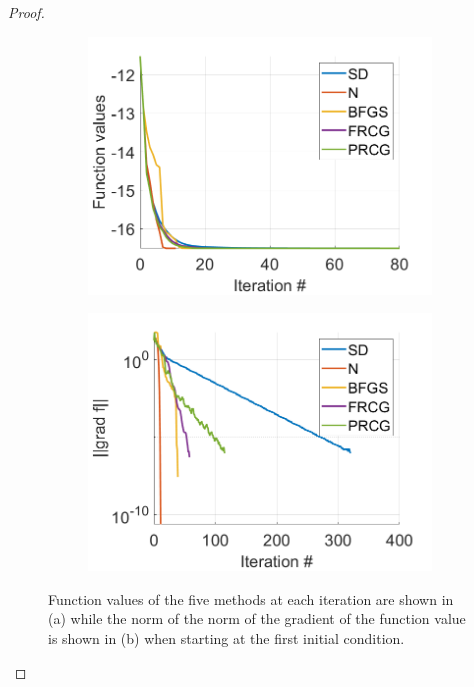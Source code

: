\documentclass[12pt]{report}
\begin{document}
\begin{problem}
\begin{proof}
        \begin{figure}[H]
            \begin{subfigure}[b]{0.5\linewidth}
                \centering
                \includegraphics[width=\linewidth]{images/1-funcval.png}
                \caption{}
                \label{fig1:a}
                \vspace{4ex}
            \end{subfigure}%
            \begin{subfigure}[b]{0.5\linewidth}
                \centering
                \includegraphics[width=\linewidth]{images/1-gradf.png}
                \caption{}
                \label{fig1:b}
                \vspace{4ex}
            \end{subfigure}
            \caption{Function values of the five methods at each iteration are shown in (a) while the norm of the norm of the gradient of the function value is shown in (b) when starting at the first initial condition.}
            \label{fig1}
        \end{figure}


\end{proof}
\end{problem}
\end{document}
